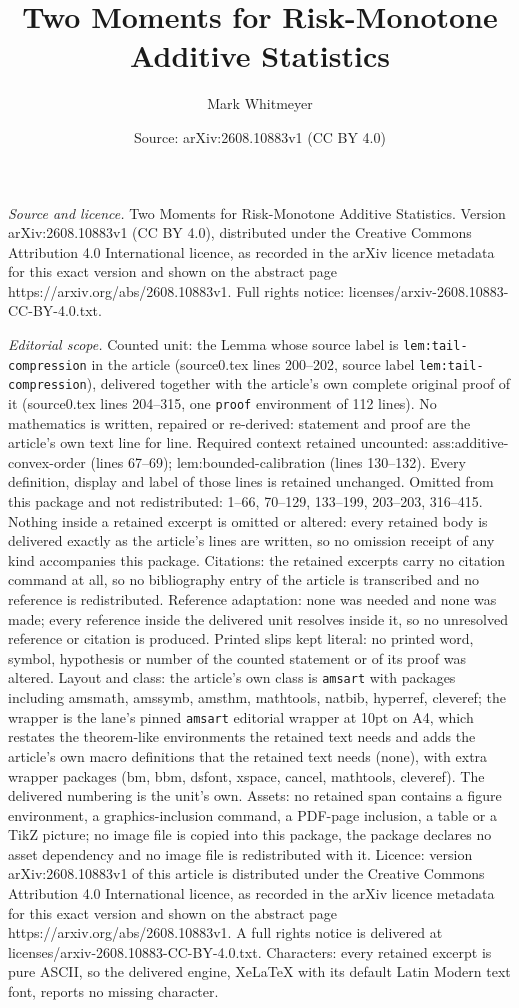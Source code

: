 \documentclass[10pt,a4paper]{amsart}
\title[Two Moments for Risk-Monotone Additive Statistics]{Two Moments for Risk-Monotone Additive Statistics}
\author{Mark Whitmeyer}
\date{Source: arXiv:2608.10883v1 (CC BY 4.0)}
\begin{document}
\maketitle

\noindent\emph{Source and licence.} Two Moments for Risk-Monotone Additive Statistics. Version arXiv:2608.10883v1 (CC BY 4.0), distributed under the Creative Commons Attribution 4.0 International licence, as recorded in the arXiv licence metadata for this exact version and shown on the abstract page https://arxiv.org/abs/2608.10883v1. Full rights notice: licenses/arxiv-2608.10883-CC-BY-4.0.txt.\par\smallskip

\noindent\textit{Editorial scope.} Counted unit: the Lemma whose source label is \texttt{lem:tail-compression} in the article (source0.tex lines 200--202, source label \texttt{lem:tail-compression}), delivered together with the article's own complete original proof of it (source0.tex lines 204--315, one \texttt{proof} environment of 112 lines). No mathematics is written, repaired or re-derived: statement and proof are the article's own text line for line. Required context retained uncounted: ass:additive-convex-order (lines 67--69); lem:bounded-calibration (lines 130--132). Every definition, display and label of those lines is retained unchanged. Omitted from this package and not redistributed: 1--66, 70--129, 133--199, 203--203, 316--415. Nothing inside a retained excerpt is omitted or altered: every retained body is delivered exactly as the article's lines are written, so no omission receipt of any kind accompanies this package. Citations: the retained excerpts carry no citation command at all, so no bibliography entry of the article is transcribed and no reference is redistributed. Reference adaptation: none was needed and none was made; every reference inside the delivered unit resolves inside it, so no unresolved reference or citation is produced. Printed slips kept literal: no printed word, symbol, hypothesis or number of the counted statement or of its proof was altered. Layout and class: the article's own class is \texttt{amsart} with packages including amsmath, amssymb, amsthm, mathtools, natbib, hyperref, cleveref; the wrapper is the lane's pinned \texttt{amsart} editorial wrapper at 10pt on A4, which restates the theorem-like environments the retained text needs and adds the article's own macro definitions that the retained text needs (none), with extra wrapper packages (bm, bbm, dsfont, xspace, cancel, mathtools, cleveref). The delivered numbering is the unit's own. Assets: no retained span contains a figure environment, a graphics-inclusion command, a PDF-page inclusion, a table or a TikZ picture; no image file is copied into this package, the package declares no asset dependency and no image file is redistributed with it. Licence: version arXiv:2608.10883v1 of this article is distributed under the Creative Commons Attribution 4.0 International licence, as recorded in the arXiv licence metadata for this exact version and shown on the abstract page https://arxiv.org/abs/2608.10883v1. A full rights notice is delivered at licenses/arxiv-2608.10883-CC-BY-4.0.txt. Characters: every retained excerpt is pure ASCII, so the delivered engine, XeLaTeX with its default Latin Modern text font, reports no missing character.
\end{document}
